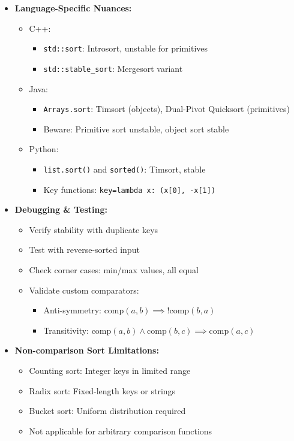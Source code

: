 \documentclass[a4paper,10pt]{book}
\begin{document}
\begin{itemize}
    \item \textbf{Language-Specific Nuances:}
    \begin{itemize}
        \item C++:
        \begin{itemize}
            \item \texttt{std::sort}: Introsort, unstable for primitives
            \item \texttt{std::stable\_sort}: Mergesort variant
        \end{itemize}
        \item Java:
        \begin{itemize}
            \item \texttt{Arrays.sort}: Timsort (objects), Dual-Pivot Quicksort (primitives)
            \item Beware: Primitive sort unstable, object sort stable
        \end{itemize}
        \item Python:
        \begin{itemize}
            \item \texttt{list.sort()} and \texttt{sorted()}: Timsort, stable
            \item Key functions: \texttt{key=lambda x: (x[0], -x[1])}
        \end{itemize}
    \end{itemize}
    
    \item \textbf{Debugging \& Testing:}
    \begin{itemize}
        \item Verify stability with duplicate keys
        \item Test with reverse-sorted input
        \item Check corner cases: min/max values, all equal
        \item Validate custom comparators:
        \begin{itemize}
            \item Anti-symmetry: $\text{comp}(a,b) \implies !\text{comp}(b,a)$
            \item Transitivity: $\text{comp}(a,b) \land \text{comp}(b,c) \implies \text{comp}(a,c)$
        \end{itemize}
    \end{itemize}
    
    \item \textbf{Non-comparison Sort Limitations:}
    \begin{itemize}
        \item Counting sort: Integer keys in limited range
        \item Radix sort: Fixed-length keys or strings
        \item Bucket sort: Uniform distribution required
        \item Not applicable for arbitrary comparison functions
    \end{itemize}
\end{itemize}
\end{document}
